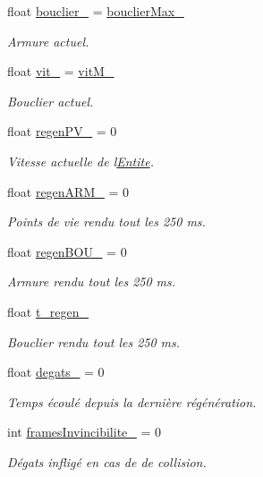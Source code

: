 \begin{DoxyCompactItemize}
float \hyperlink{class_entite_a933a79044c5ac6ffccd397c134248d44}{bouclier\+\_\+} = \hyperlink{class_entite_a7c48bbfd096baadcb84ce62e31e183d9}{bouclier\+Max\+\_\+}
\begin{DoxyCompactList}\small\item\em Armure actuel. \end{DoxyCompactList}\item 
float \hyperlink{class_entite_aaacb36948d7853e03a7f9a42aa6ad2d5}{vit\+\_\+} = \hyperlink{class_entite_ac5f9e68aa96316c6871e1980766977a9}{vit\+M\+\_\+}
\begin{DoxyCompactList}\small\item\em Bouclier actuel. \end{DoxyCompactList}\item 
float \hyperlink{class_entite_a23d58f4c9b8593a6f0882240b1bf8e8e}{regen\+P\+V\+\_\+} = 0
\begin{DoxyCompactList}\small\item\em Vitesse actuelle de l\textquotesingle{}\hyperlink{class_entite}{Entite}. \end{DoxyCompactList}\item 
float \hyperlink{class_entite_af9b881b665c6997dcc56cd37fb839dce}{regen\+A\+R\+M\+\_\+} = 0
\begin{DoxyCompactList}\small\item\em Points de vie rendu tout les 250 ms. \end{DoxyCompactList}\item 
float \hyperlink{class_entite_a12deb3f49595ab2cb4fc01a632a989e8}{regen\+B\+O\+U\+\_\+} = 0
\begin{DoxyCompactList}\small\item\em Armure rendu tout les 250 ms. \end{DoxyCompactList}\item 
float \hyperlink{class_entite_a7ba3a09757f5fd29ec4e2c8e42f7b1e6}{t\+\_\+regen\+\_\+}
\begin{DoxyCompactList}\small\item\em Bouclier rendu tout les 250 ms. \end{DoxyCompactList}\item 
float \hyperlink{class_entite_ac453832772daef8dc6eae431358a8e2a}{degats\+\_\+} = 0
\begin{DoxyCompactList}\small\item\em Temps écoulé depuis la dernière régénération. \end{DoxyCompactList}\item 
int \hyperlink{class_entite_a5d0ff5a27232c8c29436a871a8306581}{frames\+Invincibilite\+\_\+} = 0
\begin{DoxyCompactList}\small\item\em Dégats infligé en cas de de collision. \end{DoxyCompactList}\end{DoxyCompactItemize}
